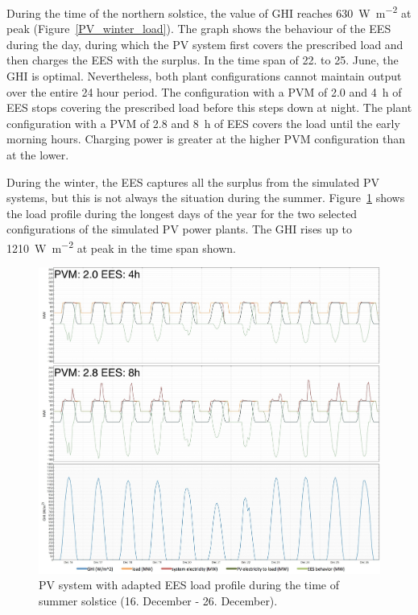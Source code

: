 During the time of the northern solstice, the value of GHI reaches \SI{630}{\watt\per\square\metre} at peak (Figure~\ref{PV_winter_load}). The graph shows the behaviour of the EES during the day, during which the PV system first covers the prescribed load and then charges the EES with the surplus. In the time span of 22. to 25. June, the GHI is optimal. Nevertheless, both plant configurations cannot maintain output over the entire 24 hour period. The configuration with a PVM of \num{2.0} and \SI{4}{h} of EES stops covering the prescribed load before this steps down at night. The plant configuration with a PVM of \num{2.8} and \SI{8}{h} of EES covers the load until the early morning hours. Charging power is greater at the higher PVM configuration than at the lower.


During the winter, the EES captures all the surplus from the simulated PV systems, but this is not always the situation during the summer. Figure~\ref{PV_summer_load} shows the load profile during the longest days of the year for the two selected configurations of the simulated PV power plants. The GHI rises up to \SI{1210}{\watt\per\square\metre} at peak in the time span shown.


\begin{figure}[htbp]
\centering
\includegraphics[width=1\linewidth]{FIG/PV_summer_load}
\caption[PV system with adapted EES load profile during the time of summer solstice.]{PV system with adapted EES load profile during the time of summer solstice (16. December - 26. December).}\label{PV_summer_load}
\end{figure}

